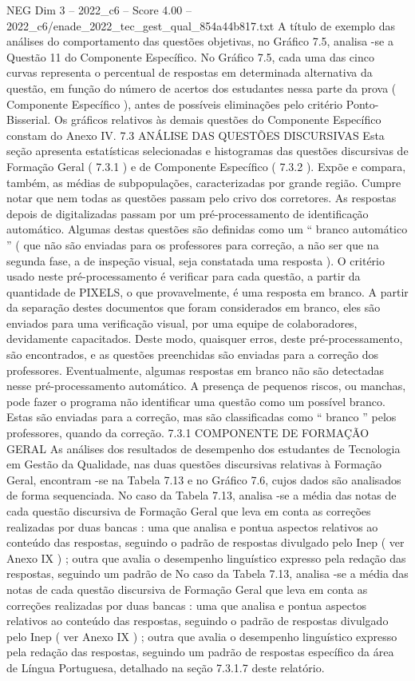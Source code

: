 \begin{textsample}{NEG Dim 3 – 2022\_c6 – Score 4.00 – 2022\_c6/enade\_2022\_tec\_gest\_qual\_854a44b817.txt}
A título de exemplo das análises do comportamento das questões objetivas, no Gráfico 7.5, analisa -se a Questão 11 do Componente Específico.
No Gráfico 7.5, cada uma das cinco curvas representa o percentual de respostas em determinada alternativa da questão, em função do número de acertos dos estudantes nessa parte da prova ( Componente Específico ), antes de possíveis eliminações pelo critério Ponto-Bisserial.
Os gráficos relativos às demais questões do Componente Específico constam do Anexo IV. 7.3 ANÁLISE DAS QUESTÕES DISCURSIVAS Esta seção apresenta estatísticas selecionadas e histogramas das questões discursivas de Formação Geral ( 7.3.1 ) e de Componente Específico ( 7.3.2 ).
Expõe e compara, também, as médias de subpopulações, caracterizadas por grande região.
Cumpre notar que nem todas as questões passam pelo crivo dos corretores.
As respostas depois de digitalizadas passam por um pré-processamento de identificação automático.
Algumas destas questões são definidas como um “ branco automático ” ( que não são enviadas para os professores para correção, a não ser que na segunda fase, a de inspeção visual, seja constatada uma resposta ).
O critério usado neste pré-processamento é verificar para cada questão, a partir da quantidade de PIXELS, o que provavelmente, é uma resposta em branco.
A partir da separação destes documentos que foram considerados em branco, eles são enviados para uma verificação visual, por uma equipe de colaboradores, devidamente capacitados.
Deste modo, quaisquer erros, deste pré-processamento, são encontrados, e as questões preenchidas são enviadas para a correção dos professores.
Eventualmente, algumas respostas em branco não são detectadas nesse pré-processamento automático.
A presença de pequenos riscos, ou manchas, pode fazer o programa não identificar uma questão como um possível branco.
Estas são enviadas para a correção, mas são classificadas como “ branco ” pelos professores, quando da correção. 7.3.1 COMPONENTE DE FORMAÇÃO GERAL As análises dos resultados de desempenho dos estudantes de Tecnologia em Gestão da Qualidade, nas duas questões discursivas relativas à Formação Geral, encontram -se na Tabela 7.13 e no Gráfico 7.6, cujos dados são analisados de forma sequenciada.
No caso da Tabela 7.13, analisa -se a média das notas de cada questão discursiva de Formação Geral que leva em conta as correções realizadas por duas bancas : uma que analisa e pontua aspectos relativos ao conteúdo das respostas, seguindo o padrão de respostas divulgado pelo Inep ( ver Anexo IX ) ; outra que avalia o desempenho linguístico expresso pela redação das respostas, seguindo um padrão de No caso da Tabela 7.13, analisa -se a média das notas de cada questão discursiva de Formação Geral que leva em conta as correções realizadas por duas bancas : uma que analisa e pontua aspectos relativos ao conteúdo das respostas, seguindo o padrão de respostas divulgado pelo Inep ( ver Anexo IX ) ; outra que avalia o desempenho linguístico expresso pela redação das respostas, seguindo um padrão de respostas específico da área de Língua Portuguesa, detalhado na seção 7.3.1.7 deste relatório.

\end{textsample}
